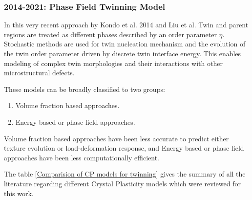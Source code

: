 \subsubsection{2014-2021: Phase Field Twinning Model}
\vspace{-0.8em}
In this very recent approach by Kondo et al. 2014 \cite{KONDO2014672} and Liu et al.  Twin and parent regions are treated as different phases described by an order parameter $\eta$. Stochastic methods are used for twin nucleation mechanism and the evolution of the twin order parameter driven by discrete twin interface energy. This enables modeling of complex twin morphologies and their interactions with other microstructural defects.

\vspace{0.5em}
These models can be broadly classified to two groups:
\vspace{-0.8em}
\begin{enumerate}
    \item Volume fraction based approaches.
    \vspace{-0.8em}
    \item Energy based or phase field approaches.
\end{enumerate}
Volume fraction based approaches have been less accurate to predict either texture evolution or load-deformation response, and Energy based or phase field approaches have been less computationally efficient.

The table \ref{Comparision of CP models for twinning} gives the summary of all the literature regarding different Crystal Plasticity models which were reviewed for this work.


